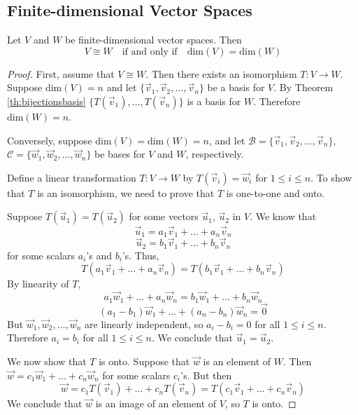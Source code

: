 \documentclass{ximera}
\begin{document}
 
\subsection*{Finite-dimensional Vector Spaces}

\begin{theorem}\label{th:ndimspacesisorn}
Let $V$ and $W$ be finite-dimensional vector spaces. Then
$$V\cong W\quad\text{if and only if}\quad \mbox{dim}(V)=\mbox{dim}(W)$$
\end{theorem}
\begin{proof}
First, assume that $V\cong W$.  Then there exists an isomorphism $T:V\rightarrow W$.  Suppose $\mbox{dim}(V)=n$ and let $\{\vec{v}_1,\vec{v}_2,\ldots ,\vec{v}_n\}$ be a basis for $V$. By Theorem \ref{th:bijectionsbasis} $\{T(\vec{v}_1),\ldots ,T(\vec{v}_n)\}$ is a basis for $W$. Therefore $\mbox{dim}(W)=n$.

Conversely, suppose $\mbox{dim}(V)=\mbox{dim}(W)=n$, and let $\mathcal{B}=\{\vec{v}_1,\vec{v}_2,\ldots ,\vec{v}_n\}$, $\mathcal{C}=\{\vec{w}_1,\vec{w}_2,\ldots ,\vec{w}_n\}$ be bases for $V$ and $W$, respectively.

Define a linear transformation $T:V\rightarrow W$ by $T(\vec{v}_i)=\vec{w}_i$ for $1\leq i\leq n$.  To show that $T$ is an isomorphism, we need to prove that $T$ is one-to-one and onto.

Suppose $T(\vec{u}_1)=T(\vec{u}_2)$ for some vectors $\vec{u}_1$, $\vec{u}_2$ in $V$.  We know that
$$\vec{u}_1=a_1\vec{v}_1+\ldots +a_n\vec{v}_n$$
$$\vec{u}_2=b_1\vec{v}_1+\ldots +b_n\vec{v}_n$$
for some scalars $a_i$'s and $b_i$'s.  Thus,
$$T(a_1\vec{v}_1+\ldots +a_n\vec{v}_n)=T(b_1\vec{v}_1+\ldots +b_n\vec{v}_n)$$
By linearity of $T$,
$$a_1\vec{w}_1+\ldots +a_n\vec{w}_n=b_1\vec{w}_1+\ldots +b_n\vec{w}_n$$
$$(a_1-b_1)\vec{w}_1+\ldots +(a_n-b_n)\vec{w}_n=\vec{0}$$
But $\vec{w}_1,\vec{w}_2,\ldots ,\vec{w}_n$ are linearly independent, so $a_i-b_i=0$ for all $1\leq i\leq n$.  Therefore $a_i=b_i$ for all $1\leq i\leq n$.  We conclude that $\vec{u}_1=\vec{u}_2$.

We now show that $T$ is onto. Suppose that $\vec{w}$ is an element of $W$.  Then $\vec{w}=c_1\vec{w}_1+\ldots +c_n\vec{w}_n$ for some scalars $c_i$'s.  But then
$$\vec{w}=c_1T(\vec{v}_1)+\ldots +c_nT(\vec{v}_n)=T(c_1\vec{v}_1+\ldots +c_n\vec{v}_n)$$
We conclude that $\vec{w}$ is an image of an element of $V$, so $T$ is onto.
\end{proof}
\end{document}
